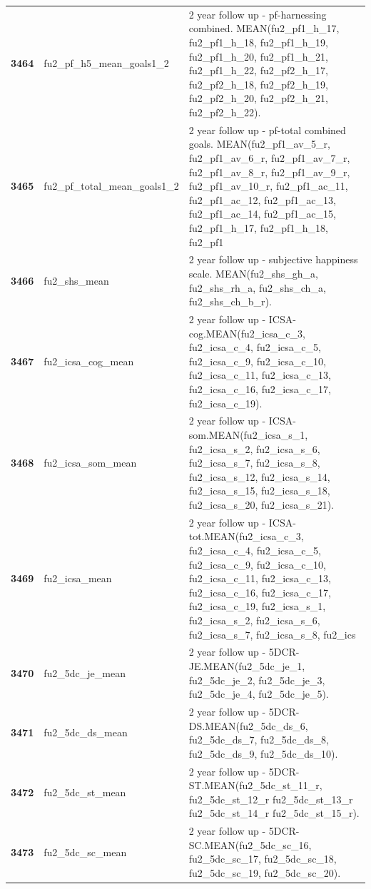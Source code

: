 \documentclass[
  letterpaper,
  DIV=11,
  numbers=noendperiod]{scrartcl}
\begin{document}
\begin{longtable}[t]{>{}cll}
\textbf{3464} & fu2\_pf\_h5\_mean\_goals1\_2 & 2 year follow up - pf-harnessing combined. MEAN(fu2\_pf1\_h\_17, fu2\_pf1\_h\_18, fu2\_pf1\_h\_19, fu2\_pf1\_h\_20, fu2\_pf1\_h\_21, fu2\_pf1\_h\_22, fu2\_pf2\_h\_17, fu2\_pf2\_h\_18, fu2\_pf2\_h\_19, fu2\_pf2\_h\_20, fu2\_pf2\_h\_21, fu2\_pf2\_h\_22).\\
\textbf{3465} & fu2\_pf\_total\_mean\_goals1\_2 & 2 year follow up - pf-total combined goals. MEAN(fu2\_pf1\_av\_5\_r, fu2\_pf1\_av\_6\_r, fu2\_pf1\_av\_7\_r, fu2\_pf1\_av\_8\_r, fu2\_pf1\_av\_9\_r, fu2\_pf1\_av\_10\_r, fu2\_pf1\_ac\_11, fu2\_pf1\_ac\_12, fu2\_pf1\_ac\_13, fu2\_pf1\_ac\_14, fu2\_pf1\_ac\_15, fu2\_pf1\_h\_17, fu2\_pf1\_h\_18, fu2\_pf1\\
\addlinespace
\textbf{3466} & fu2\_shs\_mean & 2 year follow up - subjective happiness scale. MEAN(fu2\_shs\_gh\_a, fu2\_shs\_rh\_a, fu2\_shs\_ch\_a, fu2\_shs\_ch\_b\_r).\\
\textbf{3467} & fu2\_icsa\_cog\_mean & 2 year follow up - ICSA-cog.MEAN(fu2\_icsa\_c\_3, fu2\_icsa\_c\_4, fu2\_icsa\_c\_5, fu2\_icsa\_c\_9, fu2\_icsa\_c\_10, fu2\_icsa\_c\_11, fu2\_icsa\_c\_13, fu2\_icsa\_c\_16, fu2\_icsa\_c\_17, fu2\_icsa\_c\_19).\\
\textbf{3468} & fu2\_icsa\_som\_mean & 2 year follow up - ICSA-som.MEAN(fu2\_icsa\_s\_1, fu2\_icsa\_s\_2, fu2\_icsa\_s\_6, fu2\_icsa\_s\_7, fu2\_icsa\_s\_8, fu2\_icsa\_s\_12, fu2\_icsa\_s\_14, fu2\_icsa\_s\_15, fu2\_icsa\_s\_18, fu2\_icsa\_s\_20, fu2\_icsa\_s\_21).\\
\textbf{3469} & fu2\_icsa\_mean & 2 year follow up - ICSA-tot.MEAN(fu2\_icsa\_c\_3, fu2\_icsa\_c\_4, fu2\_icsa\_c\_5, fu2\_icsa\_c\_9, fu2\_icsa\_c\_10, fu2\_icsa\_c\_11, fu2\_icsa\_c\_13, fu2\_icsa\_c\_16, fu2\_icsa\_c\_17, fu2\_icsa\_c\_19, fu2\_icsa\_s\_1, fu2\_icsa\_s\_2, fu2\_icsa\_s\_6, fu2\_icsa\_s\_7, fu2\_icsa\_s\_8, fu2\_ics\\
\textbf{3470} & fu2\_5dc\_je\_mean & 2 year follow up - 5DCR-JE.MEAN(fu2\_5dc\_je\_1, fu2\_5dc\_je\_2, fu2\_5dc\_je\_3, fu2\_5dc\_je\_4, fu2\_5dc\_je\_5).\\
\addlinespace
\textbf{3471} & fu2\_5dc\_ds\_mean & 2 year follow up - 5DCR-DS.MEAN(fu2\_5dc\_ds\_6, fu2\_5dc\_ds\_7, fu2\_5dc\_ds\_8, fu2\_5dc\_ds\_9, fu2\_5dc\_ds\_10).\\
\textbf{3472} & fu2\_5dc\_st\_mean & 2 year follow up - 5DCR-ST.MEAN(fu2\_5dc\_st\_11\_r, fu2\_5dc\_st\_12\_r fu2\_5dc\_st\_13\_r fu2\_5dc\_st\_14\_r fu2\_5dc\_st\_15\_r).\\
\textbf{3473} & fu2\_5dc\_sc\_mean & 2 year follow up - 5DCR-SC.MEAN(fu2\_5dc\_sc\_16, fu2\_5dc\_sc\_17, fu2\_5dc\_sc\_18, fu2\_5dc\_sc\_19, fu2\_5dc\_sc\_20).\\

\end{longtable}
\end{document}
